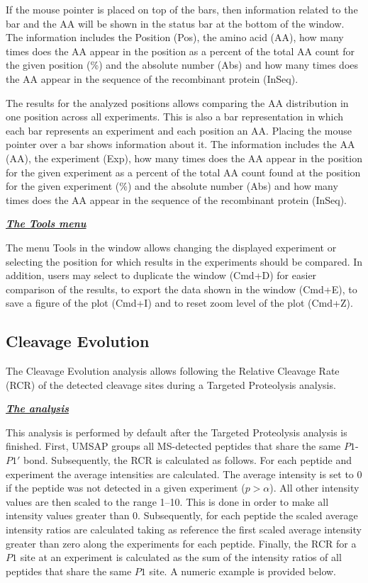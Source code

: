 If the mouse pointer is placed on top of the bars, then information related to the
bar and the AA will be shown in the status bar at the bottom of the window. The
information includes the Position (Pos), the amino acid (AA), how many times does
the AA appear in the position as a percent of the total AA count for the given position
(\%) and the absolute number (Abs) and how many times does the AA appear in the sequence
of the recombinant protein (InSeq).

The results for the analyzed positions allows comparing the AA distribution in one
position across all experiments. This is also a bar representation in which each
bar represents an experiment and each position an AA. Placing the mouse pointer
over a bar shows information about it. The information includes the AA (AA), the
experiment (Exp), how many times does the AA appear in the position for the given
experiment as a percent of the total AA count found at the position for the given
experiment (\%) and the absolute number (Abs) and how many times does the AA appear
in the sequence of the recombinant protein (InSeq).

\textit{\textbf{\underline{The Tools menu}}}

The menu Tools in the window allows changing the displayed experiment or selecting
the position for which results in the experiments should be compared. In addition,
users may select to duplicate the window (Cmd+D) for easier comparison of the results,
to export the data shown in the window (Cmd+E), to save a figure of the plot (Cmd+I)
and to reset zoom level of the plot (Cmd+Z).

\subsection{Cleavage Evolution}
\label{subsec:tarprotCutEvol}

The Cleavage Evolution analysis allows following the Relative Cleavage Rate (RCR)
of the detected cleavage sites during a Targeted Proteolysis analysis.

\textit{\textbf{\underline{The analysis}}}

This analysis is performed by default after the Targeted Proteolysis analysis is
finished. First, UMSAP groups all MS-detected peptides that share the same \(P1\)-\(P1'\)
bond. Subsequently, the RCR is calculated as follows. For each peptide and experiment
the average intensities are calculated. The average intensity is set to \num{0} if
the peptide was not detected in a given experiment ($p>\alpha$). All other intensity
values are then scaled to the range \numrange{1}{10}. This is done in order to make
all intensity values greater than \num{0}. Subsequently, for
each peptide the scaled average intensity ratios are calculated taking as reference the
first scaled average intensity greater than zero along the experiments for each peptide.
Finally, the RCR for a \(P1\) site at an experiment is calculated
as the sum of the intensity ratios of all peptides that share the same \(P1\)
site. A numeric example is provided below.

